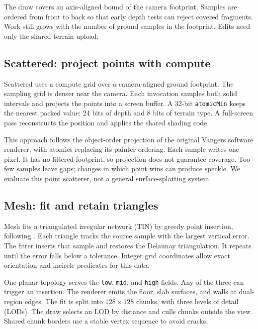 \documentclass{jcgt}
\newcommand{\code}[1]{\texttt{#1}}
\begin{document}
The draw covers an axis-aligned bound of the camera footprint. Samples are ordered from front to back so that early depth tests can reject covered fragments. Work still grows with the number of ground samples in the footprint. Edits need only the shared terrain upload.

\subsection{Scattered: project points with compute}\label{sec:scattered}

Scattered uses a compute grid over a camera-aligned ground footprint. The sampling grid is denser near the camera. Each invocation samples both solid intervals and projects the points into a screen buffer. A 32-bit \code{atomicMin} keeps the nearest packed value: 24 bits of depth and 8 bits of terrain type. A full-screen pass reconstructs the position and applies the shared shading code.

This approach follows the object-order projection of the original Vangers software renderer, with atomics replacing its painter ordering. Each sample writes one pixel. It has no filtered footprint, so projection does not guarantee coverage. Too few samples leave gaps; changes in which point wins can produce speckle. We evaluate this point scatterer, not a general surface-splatting system.

\subsection{Mesh: fit and retain triangles}\label{sec:mesh}

Mesh fits a triangulated irregular network (TIN) by greedy point insertion, following \citet{garland1995terrain}. Each triangle tracks the source sample with the largest vertical error. The fitter inserts that sample and restores the Delaunay triangulation. It repeats until the error falls below a tolerance. Integer grid coordinates allow exact orientation and incircle predicates for this data.

One planar topology serves the \code{low}, \code{mid}, and \code{high} fields. Any of the three can trigger an insertion. The renderer emits the floor, slab surfaces, and walls at dual-region edges. The fit is split into $128\times128$ chunks, with three levels of detail (LODs). The draw selects an LOD by distance and culls chunks outside the view. Shared chunk borders use a stable vertex sequence to avoid cracks.
\end{document}
